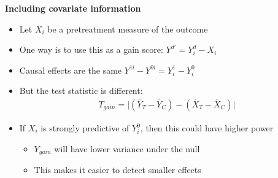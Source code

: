 \documentclass[notes=show]{beamer}
\begin{document}





\begin{frame}[plain]
\begin{center}
\textbf{Including covariate information}
\end{center}

\begin{itemize}
\item Let $X_i$ be a pretreatment measure of the outcome
\item One way is to use this as a gain score: $Y^{d'} = Y_i^d - X_i$
\item Causal effects are the same $Y^{1i} - Y^{0i} = Y_i^1 - Y_i^0$
\item But the test statistic is different:
\begin{eqnarray*}
T_{gain} = \bigg | ( \overline{Y}_T - \overline{Y}_C ) - (\overline{X}_T - \overline{X}_C ) \bigg |
\end{eqnarray*}
\item If $X_i$ is strongly predictive of $Y_i^0$, then this could have higher power
	\begin{itemize}
	\item $Y_{gain}$ will have lower variance under the null
	\item This makes it easier to detect smaller effects
	\end{itemize}
\end{itemize}

\end{frame}
\end{document}
